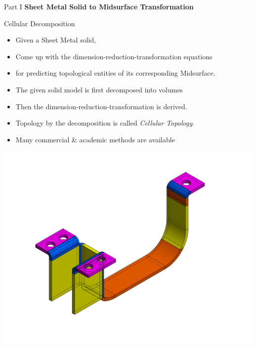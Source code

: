 
\begin{frame}{Part I}
\centering \textbf{\Large Sheet Metal Solid to Midsurface Transformation}
\end{frame}

\begin{frame}{Cellular Decomposition}
\begin{itemize}[noitemsep,label=\textbullet,topsep=2pt,parsep=2pt,partopsep=2pt]
\item Given a Sheet Metal solid, 
\item Come up with the dimension-reduction-transformation equations 
\item for predicting topological entities of its corresponding Midsurface. 
\item The given solid model is first decomposed into volumes
\item Then the dimension-reduction-transformation is derived. 
\item Topology by the decomposition is called {\em Cellular Topology}.  
\item Many commercial \& academic methods are available%
\end{itemize}

\vspace{-5mm}

\begin{center}\includegraphics[width=0.4\linewidth]{../Common/images/VolDecomp1.pdf}\end{center}

\vspace{-3mm}

\end{frame}


